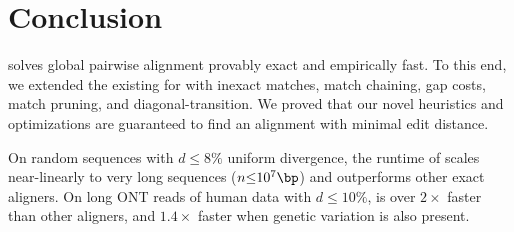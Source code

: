 \section{Conclusion} \label{sec:conclusion}

\astarpa solves global pairwise alignment provably exact and empirically fast.
To this end, we extended the existing \sh for \A with inexact matches, match
chaining, gap costs, match pruning, and diagonal-transition. We proved that our
novel heuristics and optimizations are guaranteed to find an alignment with
minimal edit distance.

On random sequences with $d{\leq}8\%$ uniform divergence, the runtime of
\astarpa scales near-linearly to very long sequences ($n{\leq}10^7\bp$) and
outperforms other exact aligners. On long ONT reads of human data with $d{\leq}10\%$,
\astarpa is over $2\times$ faster than other aligners, and $1.4\times$ faster
when genetic variation is also present.
\vspace{-2em}
